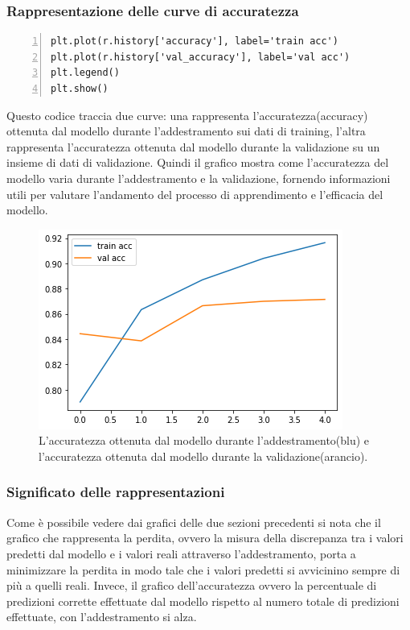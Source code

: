 \documentclass[a4paper,final,12pt]{report}
\begin{document}
\subsubsection{Rappresentazione delle curve di accuratezza}
\begin{lstlisting}[caption={Codice per il grafico delle curve di accuratezza.}, label={lst:curve_accuratezza}, breaklines, escapechar=`\%, frame=lines, basicstyle=\small\ttfamily, keepspaces=true, numbers=left]
plt.plot(r.history['accuracy'], label='train acc')
plt.plot(r.history['val_accuracy'], label='val acc')
plt.legend()
plt.show()
\end{lstlisting}
Questo codice traccia due curve: una rappresenta l'accuratezza(accuracy) ottenuta dal modello durante l'addestramento sui dati di training, l'altra rappresenta l'accuratezza ottenuta dal modello durante la validazione su un insieme di dati di validazione. Quindi il grafico mostra come l'accuratezza del modello varia durante l'addestramento e la validazione, fornendo informazioni utili per valutare l'andamento del processo di apprendimento e l'efficacia del modello. 
\begin{figure}[hbtp]
\centering
\includegraphics[scale=0.70]{img_concettuale/grpPP.png}
\caption{L'accuratezza ottenuta dal modello durante l'addestramento(blu) e l'accuratezza ottenuta dal modello durante la validazione(arancio).}
\end{figure}

\subsubsection{Significato delle rappresentazioni}
Come è possibile vedere dai grafici delle due sezioni precedenti si nota che
il grafico che rappresenta la perdita, ovvero la misura della discrepanza tra i valori predetti dal modello e i valori reali attraverso l'addestramento, porta a minimizzare la perdita in modo tale che i valori predetti si avvicinino sempre di più a quelli reali. Invece, il grafico dell'accuratezza ovvero la percentuale di predizioni corrette effettuate dal modello rispetto al numero totale di predizioni effettuate, con l'addestramento si alza.
\end{document}
